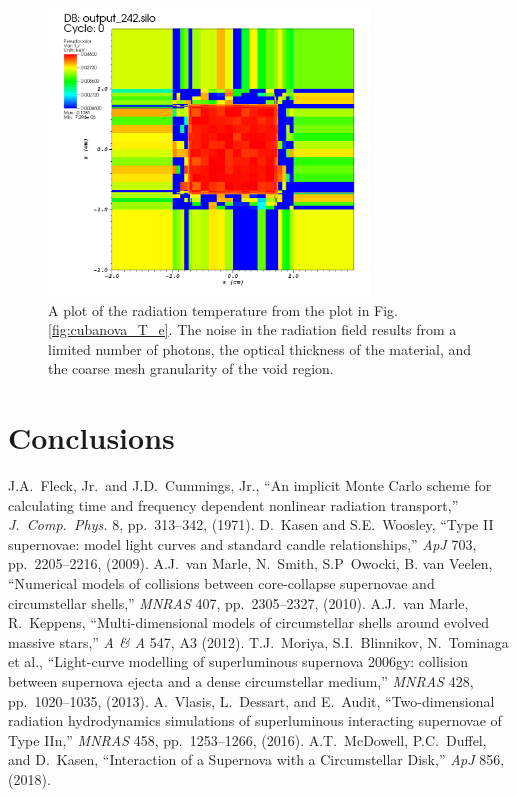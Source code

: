 \documentclass[]{article}
\begin{document}
	\begin{figure} [h!]
		\centering
		\includegraphics[height=3in]{Figures/cubanova_T_r.png}
		\caption{A plot of the radiation temperature from the plot in Fig. \ref{fig:cubanova_T_e}. The noise in the radiation field results from a limited number of photons, the optical thickness of the material, and the coarse mesh granularity of the void region.}
		\label{fig:cubanova_T_r}
	\end{figure}


\section{Conclusions}


\begin{thebibliography}{99}
 J.A.\ Fleck, Jr.\ and J.D.\ Cummings, Jr., ``An implicit Monte Carlo scheme for calculating time and frequency dependent nonlinear radiation transport,''
  {\em J.\ Comp.\ Phys.} 8, pp.\ 313--342, (1971).
 D.\ Kasen and S.E.\ Woosley, ``Type II supernovae: model light curves and standard candle relationships,''
  {\em ApJ} 703, pp.\ 2205--2216, (2009).
 A.J.\ van Marle, N.\ Smith, S.P\ Owocki, B. van Veelen, ``Numerical models of collisions between core-collapse supernovae and circumstellar shells,''
  {\em MNRAS} 407, pp.\ 2305--2327, (2010).
 A.J.\ van Marle, R.\ Keppens, ``Multi-dimensional models of circumstellar shells around evolved massive stars,''
  {\em A \& A} 547, A3 (2012).
 T.J.\ Moriya, S.I.\ Blinnikov, N.\ Tominaga et al., ``Light-curve modelling of superluminous supernova 2006gy: collision between supernova ejecta and a dense circumstellar medium,''
  {\em MNRAS} 428, pp.\ 1020--1035, (2013).
 A.\ Vlasis, L.\ Dessart, and E.\ Audit, ``Two-dimensional radiation hydrodynamics simulations of superluminous interacting supernovae of Type IIn,''
  {\em MNRAS} 458, pp.\ 1253--1266, (2016).
 A.T.\ McDowell, P.C.\ Duffel, and D.\ Kasen, ``Interaction of a Supernova with a Circumstellar Disk,''
  {\em ApJ} 856, (2018).
\end{thebibliography}
\end{document}
